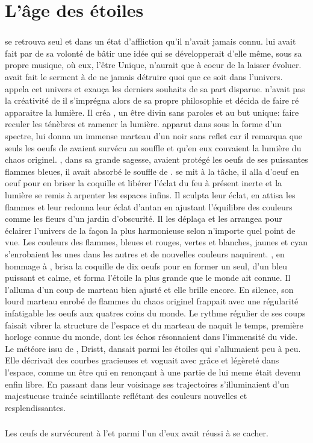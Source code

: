 \chapter{L'âge des étoiles}

\subsection{\Cind}

\Cind se retrouva seul et dans un état d'affliction qu'il n'avait jamais connu. \Mey lui avait fait par de sa volonté de bâtir une idée qui se développerait d'elle même, sous sa propre musique, où eux, l'être Unique, n'aurait que à coeur de la laisser évoluer. \Cind avait fait le serment à \Mey de ne jamais détruire quoi que ce soit dans l'univers. \Cind appela cet univers \dreyma et exauça les derniers souhaits de sa part disparue. \Cind n'avait pas la créativité de \Mey il s'imprégna alors de sa propre philosophie et décida de faire ré apparaitre la lumière. Il créa \carac, un être divin sans paroles et au but unique: faire reculer les ténèbres et ramener la lumière. \carac apparut dans \dreyma sous la forme d'un spectre, \Cind lui donna un immense marteau d'un noir sans reflet car il remarqua que seuls les oeufs de \Tot avaient survécu au souffle et qu'en eux couvaient la lumière du chaos originel. \Boromu, dans sa grande sagesse, avaient protégé les oeufs de ses puissantes flammes bleues, il avait absorbé le souffle de \Cind.  \carac se mit à la tâche, il alla d'oeuf en oeuf pour en briser la coquille et libérer l'éclat du feu à présent inerte et la lumière se remis à arpenter les espaces infins. Il sculpta leur éclat, en attisa les flammes et leur redonna leur éclat d'antan en ajustant l'équilibre des couleurs comme les fleurs d'un jardin d'obscurité. Il les déplaça et les arrangea pour éclairer l'univers de la façon la plus harmonieuse selon n'importe quel point de vue. Les couleurs des flammes, bleues et rouges, vertes et blanches, jaunes et cyan s'enrobaient les unes dans les autres et de nouvelles couleurs naquirent. \carac, en hommage à \Boromu, brisa la coquille de dix oeufs pour en former un seul, d'un bleu puissant et calme, et forma l'étoile la plus grande que le monde ait connue. Il l'alluma d'un coup de marteau bien ajusté et elle brille encore. En silence, son lourd marteau enrobé de flammes du chaos originel frappait avec une régularité infatigable les oeufs aux quatres coins du monde. Le rythme régulier de ses coups faisait vibrer la structure de l'espace et du marteau de \carac naquit le temps, première horloge connue du monde, dont les échos résonnaient dans l'immensité du vide. Le météore issu de \Mey, Dristt, dansait parmi les étoiles qui s'allumaient peu à peu. Elle décrivait des courbes gracieuses et voguait avec grâce et légèreté dans l'espace, comme un être qui en renonçant à une partie de lui meme était devenu enfin libre. En passant dans leur voisinage ses trajectoires s'illuminaient d'un majestueuse trainée scintillante reflétant des couleurs nouvelles et resplendissantes.


\subsection{\Ogo}

Les œufs de \Tot survécurent à l'\Extinction et parmi l'un d'eux \Ogo avait réussi à se cacher.